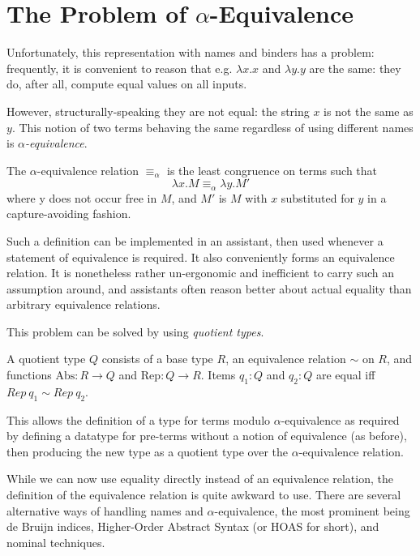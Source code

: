\section{The Problem of \(\alpha\)-Equivalence}
Unfortunately, this representation with names and binders has a problem: frequently, it is convenient to reason that e.g. \(\lambda x.x\) and \(\lambda y.y\) are the same: they do, after all, compute equal values on all inputs.

However, structurally-speaking they are not equal: the string \(x\) is not the same as \(y\).
This notion of two terms behaving the same regardless of using different names is \emph{\(\alpha\)-equivalence}.
\begin{definition}
The \(\alpha\)-equivalence relation \(\equiv_\alpha\) is the least congruence on terms such that
\[
\lambda x.M \equiv_\alpha \lambda y.M'
\]
where y does not occur free in \(M\), and \(M'\) is \(M\) with \(x\) substituted for \(y\) in a capture-avoiding fashion.
\end{definition}

Such a definition can be implemented in an assistant, then used whenever a statement of equivalence is required.
It also conveniently forms an equivalence relation.
It is nonetheless rather un-ergonomic and inefficient to carry such an assumption around, and assistants often reason better about actual equality than arbitrary equivalence relations.

This problem can be solved by using \emph{quotient types}.
\begin{definition}
A quotient type \(Q\) consists of a base type \(R\), an equivalence relation \(\sim\) on \(R\), and functions \(\mathrm{Abs} : R \to Q\) and \(\mathrm{Rep} : Q \to R\).
Items \(q_1 : Q\) and \(q_2 : Q\) are equal iff \(Rep\ q_1 \sim Rep\ q_2\).
\end{definition}

This allows the definition of a type for terms modulo \(\alpha\)-equivalence as required by defining a datatype for pre-terms without a notion of equivalence (as before), then producing the new type as a quotient type over the \(\alpha\)-equivalence relation.

While we can now use equality directly instead of an equivalence relation, the definition of the equivalence relation is quite awkward to use.
There are several alternative ways of handling names and \(\alpha\)-equivalence, the most prominent being de Bruijn indices, Higher-Order Abstract Syntax (or HOAS for short), and nominal techniques.

